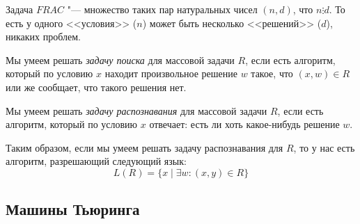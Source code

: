	\begin{exmp}
		Задача $FRAC$ "--- множество таких пар натуральных чисел $(n, d)$, что $n \vdots d$.
		То есть у одного <<условия>> ($n$) может быть несколько <<решений>> ($d$), никаких проблем.
	\end{exmp}

	\begin{Def}
		Мы умеем решать \textit{задачу поиска} для массовой задачи $R$, если есть алгоритм, который по условию $x$
		находит произвольное решение $w$ такое, что $(x, w) \in R$ или же сообщает, что такого решения нет.
	\end{Def}

	\begin{Def}
		Мы умеем решать \textit{задачу распознавания} для массовой задачи $R$, если есть алгоритм, который по условию $x$
		отвечает: есть ли хоть какое-нибудь решение $w$.
	\end{Def}
	\begin{Rem}
		Таким образом, если мы умеем решать задачу распознавания для $R$, то у нас есть алгоритм, разрешающий следующий язык:
		\[ L(R) = \{ x \mid \exists w \colon (x, y) \in R \} \]
	\end{Rem}

\subsection{Машины Тьюринга}
